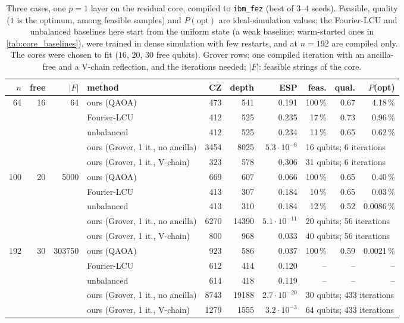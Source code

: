 \begin{table}[t]
\centering\footnotesize\setlength{\tabcolsep}{4pt}
\caption{ Three cases, one $p=1$ layer on the residual core, compiled to \texttt{ibm\_fez} (best of $3$--$4$ seeds). Feasible, quality ($1$ is the optimum, among feasible samples) and $P(\mathrm{opt})$ are ideal-simulation values; the Fourier-LCU and unbalanced baselines here start from the uniform state (a weak baseline; warm-started ones in \cref{tab:core_baselines}), were trained in dense simulation with few restarts, and at $n=192$ are compiled only. The cores were chosen to fit ($16$, $20$, $30$ free qubits). Grover rows: one compiled iteration with an ancilla-free and a V-chain reflection, and the iterations needed; $|F|$: feasible strings of the core.}\label{tab:core_cases}
\begin{tabular}{rrrlrrrrrr}
\toprule
$n$ & free & $|F|$ & method & CZ & depth & ESP & feas. & qual. & $P$(opt)\\
\midrule
64 & 16 & 64 & ours (QAOA) & 473 & 541 & 0.191 & 100\,\% & 0.67 & 4.18\,\%\\
 & &  & Fourier-LCU & 412 & 525 & 0.235 & 17\,\% & 0.73 & 0.96\,\%\\
 & &  & unbalanced & 412 & 525 & 0.234 & 11\,\% & 0.65 & 0.62\,\%\\
 & & & ours (Grover, 1 it., no ancilla) & 3454 & 8025 & $5.3\cdot10^{-6}$ & \multicolumn{3}{l}{16 qubits; 6 iterations}\\
 & & & ours (Grover, 1 it., V-chain) & 323 & 578 & 0.306 & \multicolumn{3}{l}{31 qubits; 6 iterations}\\
\midrule
100 & 20 & 5000 & ours (QAOA) & 669 & 607 & 0.066 & 100\,\% & 0.65 & 0.40\,\%\\
 & &  & Fourier-LCU & 413 & 307 & 0.184 & 10\,\% & 0.65 & 0.03\,\%\\
 & &  & unbalanced & 413 & 310 & 0.184 & 12\,\% & 0.52 & 0.0086\,\%\\
 & & & ours (Grover, 1 it., no ancilla) & 6270 & 14390 & $5.1\cdot10^{-11}$ & \multicolumn{3}{l}{20 qubits; 56 iterations}\\
 & & & ours (Grover, 1 it., V-chain) & 800 & 968 & 0.033 & \multicolumn{3}{l}{40 qubits; 56 iterations}\\
\midrule
192 & 30 & 303750 & ours (QAOA) & 923 & 586 & 0.037 & 100\,\% & 0.59 & 0.0021\,\%\\
 & &  & Fourier-LCU & 612 & 414 & 0.120 & -- & -- & --\\
 & &  & unbalanced & 614 & 418 & 0.119 & -- & -- & --\\
 & & & ours (Grover, 1 it., no ancilla) & 8743 & 19188 & $2.7\cdot10^{-20}$ & \multicolumn{3}{l}{30 qubits; 433 iterations}\\
 & & & ours (Grover, 1 it., V-chain) & 1279 & 1555 & $3.2\cdot10^{-3}$ & \multicolumn{3}{l}{64 qubits; 433 iterations}\\
\bottomrule
\end{tabular}
\end{table}
